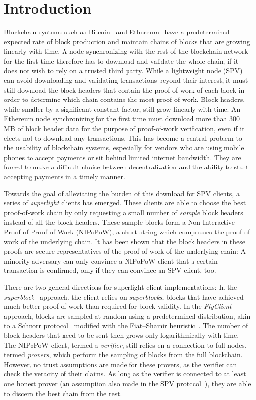 \section{Introduction}
Blockchain systems such as Bitcoin~\cite{nakamoto} and
Ethereum~\cite{buterin,wood} have a predetermined expected rate of block
production and maintain chains of blocks that are growing linearly
with time. A node synchronizing with the rest of the blockchain
network for the first time therefore has to download and validate the whole
chain, if it does not wish to rely on a trusted third party. While a lightweight
node (SPV) can avoid downloading and validating transactions beyond their
interest, it must still download the block headers that contain the
proof-of-work\cite{pow} of each block in order to determine which chain contains
the most proof-of-work. Block headers, while smaller by a significant constant
factor, still grow linearly with time. An Ethereum node synchronizing for the
first time must download more than $300$ MB of block header data for the purpose
of proof-of-work verification, even if it elects not to download any
transactions. This has become a central problem to the usability of blockchain
systems, especially for vendors who are using mobile phones to accept payments
or sit behind limited internet bandwidth. They are forced to make a difficult
choice between decentralization and the ability to start accepting payments in a
timely manner.

Towards the goal of alleviating the burden of this download for SPV clients, a
series of \emph{superlight} clients has emerged. These clients are able to
choose the best proof-of-work chain by only requesting a small number of
\emph{sample} block headers instead of all the block headers. These sample
blocks form a Non-Interactive Proof of Proof-of-Work (NIPoPoW), a short string
which compresses the proof-of-work of the underlying chain. It has been shown
that the block headers in these proofs are secure representatives of the
proof-of-work of the underlying chain: A minority adversary can only convince a
NIPoPoW client that a certain transaction is confirmed, only if they can
convince an SPV client, too.

There are two general directions for superlight client implementations: In the
\emph{superblock}~\cite{nipopows,compactsuperblocks} approach, the client
relies on \emph{superblocks}, blocks that have achieved much better
proof-of-work than required for block validity. In the
\emph{FlyClient}~\cite{flyclient} approach, blocks are sampled at random using a
predetermined distribution, akin to a Schnorr protocol~\cite{schnorr} modified
with the Fiat--Shamir heuristic~\cite{fiatshamir}. The number of block headers
that need to be sent then grows only logarithmically with time. The NIPoPoW
client, termed a \emph{verifier}, still relies on a connection to full nodes,
termed \emph{provers}, which perform the sampling of blocks from the full
blockchain. However, no trust assumptions are made for these provers, as the
verifier can check the veracity of their claims. As long as the verifier is
connected to at least one honest prover (an assumption also made in the SPV
protocol~\cite{eclipse,eclipse-ethereum}), they are able to discern the best chain from the rest.

